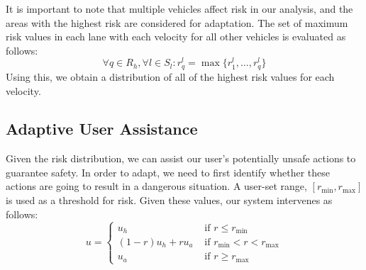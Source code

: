 \documentclass[letterpaper, 10 pt, conference]{ieeeconf}  %
\newcommand\NB[1]{$\spadesuit$\footnote{NB: #1}}
\newcommand\RP[1]{$\clubsuit$\footnote{RP: #1}}
\begin{document}
It is important to note that multiple vehicles affect risk in our analysis, and the areas with the highest risk are considered for adaptation. The set of maximum risk values in each lane with each velocity for all other vehicles is evaluated as follows: %
\begin{equation}
    \forall q\in R_h,\forall{l}\in{S_l}: r_{q}^l = \max\{r^l_{1},\ldots,r^l_{q}\}
\end{equation}
Using this, we obtain a distribution of all of the highest risk values for each velocity.


\subsection{Adaptive User Assistance}

Given the risk distribution, we can assist our user's potentially unsafe actions to guarantee safety. In order to adapt, we need to first identify whether these actions are going to result in a dangerous situation. A user-set range, $[r_\min,r_\max]$ is used as a threshold for risk. Given these values, our system intervenes as follows:
\begin{equation}
    u = \begin{cases}
    u_h & \text{ if } r\leq r_\min \\
    (1-r)u_h + r u_a & \text { if } r_\min<r<r_\max \\
    u_a & \text{ if } r\geq r_\max
    \end{cases}
\end{equation}
\end{document}

